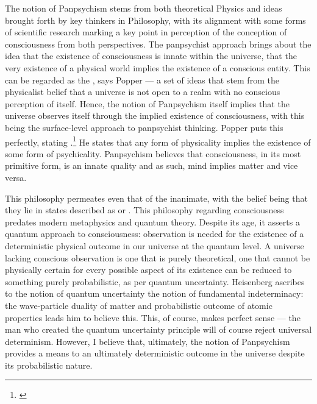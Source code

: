 \documentclass[openany,oneside,12pt,hidelinks]{book}
\begin{document}
The notion of Panpsychism stems from both theoretical Physics and ideas
brought forth by key thinkers in Philosophy, with its alignment with some
forms of scientific research marking a key point in perception of the
conception of consciousness from both perspectives. The panpsychist approach
brings about the idea that the existence of consciousness is innate within the
universe, that the very existence of a physical world implies the existence of
a conscious entity. This can be regarded as the , says Popper --- a set of
ideas that stem from the physicalist belief that a universe is not open to a
realm with no conscious perception of itself. Hence, the notion of
Panpsychism itself implies that the universe observes itself through the
implied existence of consciousness, with this being the surface-level approach
to panpsychist thinking. Popper puts this perfectly, stating
.\footnote{\cite{4d951e62-53cf-3139-b071-86c179b408b8}} He states that
any form of physicality implies the existence of some form of psychicality.
Panpsychism believes that consciousness, in its most primitive form, is an
innate quality and as such, mind implies matter and vice versa.

This philosophy permeates even that of the inanimate, with the belief being
that they lie in states described as  or
. This philosophy regarding consciousness
predates modern metaphysics and quantum theory. Despite its age, it asserts a
quantum approach to consciousness: observation is needed for the existence of a
deterministic physical outcome in our universe at the quantum level. A universe
lacking conscious observation is one that is purely theoretical, one that
cannot be physically certain for every possible aspect of its existence can be
reduced to something purely probabilistic, as per quantum uncertainty.
Heisenberg ascribes to the notion of quantum uncertainty the notion of
fundamental indeterminacy: the wave-particle duality of matter and
probabilistic outcome of atomic properties leads him to believe this. This, of
course, makes perfect sense --- the man who created the quantum uncertainty
principle will of course reject universal determinism. However, I believe that,
ultimately, the notion of Panpsychism provides a means to an ultimately
deterministic outcome in the universe despite its probabilistic nature.
\end{document}
